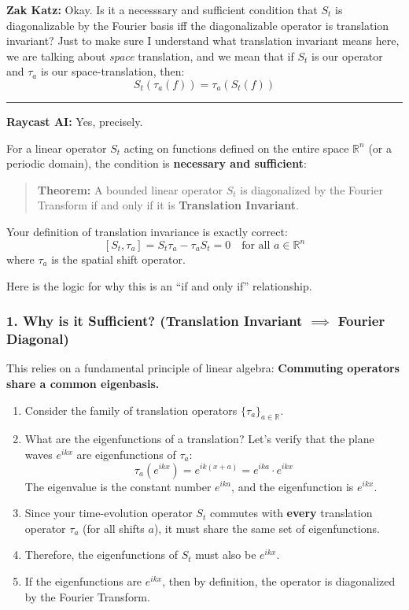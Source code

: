 \documentclass[oneside]{book}
\begin{document}
\noindent \textbf{Zak Katz:} Okay. Is it a necesssary and sufficient condition that $S_t$ is diagonalizable by the Fourier basis iff the diagonalizable operator is translation invariant? Just to make sure I understand what translation invariant means here, we are talking about \textit{space} translation, and we mean that if $S_t$ is our operator and $\tau_a$ is our space-translation, then:
\[
S_t(\tau_a(f)) = \tau_a(S_t(f))
\]

\noindent\rule{\textwidth}{0.4pt}

\noindent \textbf{Raycast AI:}
Yes, precisely.

For a linear operator $S_t$ acting on functions defined on the entire space $\mathbb{R}^n$ (or a periodic domain), the condition is \textbf{necessary and sufficient}:

\begin{quote}
\textbf{Theorem:} A bounded linear operator $S_t$ is diagonalized by the Fourier Transform if and only if it is \textbf{Translation Invariant}.
\end{quote}

Your definition of translation invariance is exactly correct:
\[ [S_t, \tau_a] = S_t \tau_a - \tau_a S_t = 0 \quad \text{for all } a \in \mathbb{R}^n \]
where $\tau_a$ is the spatial shift operator.

Here is the logic for why this is an ``if and only if'' relationship.

\subsubsection*{1. Why is it Sufficient? (Translation Invariant $\implies$ Fourier Diagonal)}
This relies on a fundamental principle of linear algebra: \textbf{Commuting operators share a common eigenbasis.}

\begin{enumerate}
    \item Consider the family of translation operators $\{\tau_a\}_{a \in \mathbb{R}}$.
    \item What are the eigenfunctions of a translation? Let's verify that the plane waves $e^{ikx}$ are eigenfunctions of $\tau_a$:
    \[ \tau_a(e^{ikx}) = e^{ik(x+a)} = e^{ika} \cdot e^{ikx} \]
    The eigenvalue is the constant number $e^{ika}$, and the eigenfunction is $e^{ikx}$.
    \item Since your time-evolution operator $S_t$ commutes with \textbf{every} translation operator $\tau_a$ (for all shifts $a$), it must share the same set of eigenfunctions.
    \item Therefore, the eigenfunctions of $S_t$ must also be $e^{ikx}$.
    \item If the eigenfunctions are $e^{ikx}$, then by definition, the operator is diagonalized by the Fourier Transform.
\end{enumerate}
\end{document}
